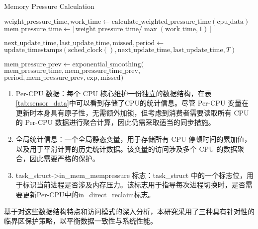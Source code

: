 \begin{algorithm}[H]
    \caption{Memory Pressure Calculation}
    \label{alg:mem_pressure_optimized}
    \SetAlgoLined
    \DontPrintSemicolon


    \BlankLine

    \(\text{weight\_pressure\_time}, \text{work\_time} \gets \text{calculate\_weighted\_pressure\_time}(\text{cpu\_data})\)\;
    \(\text{mem\_pressure\_time} \gets \lfloor \text{weight\_pressure\_time}/\max(\text{work\_time},1)\rfloor\)\;

    \(\text{next\_update\_time}, \text{last\_update\_time}, \text{missed}, \text{period} \gets\) \(\text{update\_timestamps}(\text{sched\_clock}(), \text{next\_update\_time}, \text{last\_update\_time}, T)\)\;

    \(\text{mem\_pressure\_prev} \gets \text{exponential\_smoothing}(\)
    \qquad \(\text{mem\_pressure\_time}, \text{mem\_pressure\_time\_prev},\)
    \qquad \(\text{period}, \text{mem\_pressure\_prev}, \text{exp}, \text{missed})\)\;
\end{algorithm}
\begin{enumerate}
    \item  Per-CPU 数据：每个 CPU 核心维护一份独立的数据结构，在表\ref{tab:sensor_data}中可以看到存储了CPU的统计信息。尽管 Per-CPU 变量在更新时本身具有原子性，无需额外加锁，但考虑到消费者需要读取所有 CPU 的 Per-CPU 数据进行聚合计算，因此仍需采取适当的同步措施。
    \item 全局统计信息：一个全局静态变量，用于存储所有 CPU 停顿时间的累加值，以及用于平滑计算的历史统计数据。该变量的访问涉及多个 CPU 的数据聚合，因此需要严格的保护。
    \item task\_struct->in\_mem\_mempressure 标志：task\_struct 中的一个标志位，用于标识当前进程是否涉及内存压力。该标志用于指导每次进程切换时，是否需要更新Per-CPU中的in\_direct\_reclaim标志。
\end{enumerate}

基于对这些数据结构特点和访问模式的深入分析，本研究采用了三种具有针对性的临界区保护策略，以平衡数据一致性与系统性能。


